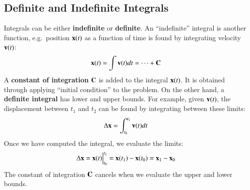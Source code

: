 \documentclass{../../../oss-handout}
\newcommand{\mb}[1]{\ensuremath\mathbf{#1}}
\begin{document}
\subsection{Definite and Indefinite Integrals}
Integrals can be either \textbf{indefinite} or \textbf{definite}. An
``indefinite'' integral is another function, e.g.\ position $\mb{x}(t)$ as a
function of time is found by integrating velocity $\mb{v}(t)$:
\begin{equation*}
  \mb{x}(t)=\int\mb{v}(t)dt=\cdots+\mb{C}
\end{equation*}
A \textbf{constant of integration} $\mb{C}$ is added to the integral
$\mb{x}(t)$. It is obtained through applying ``initial condition'' to the
problem. On the other hand, a \textbf{definite integral} has lower and upper
bounds. For example, given $\mb{v}(t)$, the displacement between $t_1$ and
$t_2$ can be found by integrating between these limits:
\begin{equation*}
  \Delta\mb{x}=\int_{t_0}^{t_1} \mb{v}(t)dt
\end{equation*}
Once we have computed the integral, we evaluate the limits:
\begin{equation*}
  \Delta\mb{x} =
  \mb{x}(t)\Big|^{t_1}_{t_0}=
  \mb{x}(t_1)-\mb{x}(t_0)=
  \mb{x}_1-\mb{x}_0
\end{equation*}
The constant of integration $\mb{C}$ cancels when we evaluate the upper and
lower bounds.
\end{document}
